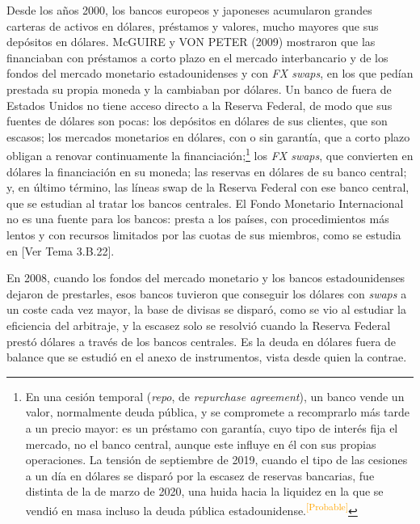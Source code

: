 \documentclass[10pt,a4paper]{article}
\newcommand{\authorfont}[1]{{\fontfamily{EBGaramond-TLF}\selectfont #1}}
\newcounter{anexo}
\begin{document}
Desde los años 2000, los bancos europeos y japoneses acumularon grandes carteras de activos en dólares, préstamos y valores, mucho mayores que sus depósitos en dólares. McGUIRE y VON PETER (2009) mostraron que las financiaban con préstamos a corto plazo en el mercado interbancario y de los fondos del mercado monetario estadounidenses y con \textit{FX swaps}, en los que pedían prestada su propia moneda y la cambiaban por dólares. Un banco de fuera de Estados Unidos no tiene acceso directo a la Reserva Federal, de modo que sus fuentes de dólares son pocas: los depósitos en dólares de sus clientes, que son escasos; los mercados monetarios en dólares, con o sin garantía, que a corto plazo obligan a renovar continuamente la financiación;\footnote{%
    En una cesión temporal (\textit{repo}, de \textit{repurchase agreement}), un banco vende un valor, normalmente deuda pública, y se compromete a recomprarlo más tarde a un precio mayor: es un préstamo con garantía, cuyo tipo de interés fija el mercado, no el banco central, aunque este influye en él con sus propias operaciones. La tensión de septiembre de 2019, cuando el tipo de las cesiones a un día en dólares se disparó por la escasez de reservas bancarias, fue distinta de la de marzo de 2020, una huida hacia la liquidez en la que se vendió en masa incluso la deuda pública estadounidense.\textcolor{orange}{\textsuperscript{[Probable]}}
} los \textit{FX swaps}, que convierten en dólares la financiación en su moneda; las reservas en dólares de su banco central; y, en último término, las líneas swap de la Reserva Federal con ese banco central, que se estudian al tratar los bancos centrales. El Fondo Monetario Internacional no es una fuente para los bancos: presta a los países, con procedimientos más lentos y con recursos limitados por las cuotas de sus miembros, como se estudia en [\authorfont{Ver Tema 3.B.22}].

En 2008, cuando los fondos del mercado monetario y los bancos estadounidenses dejaron de prestarles, esos bancos tuvieron que conseguir los dólares con \textit{swaps} a un coste cada vez mayor, la base de divisas se disparó, como se vio al estudiar la eficiencia del arbitraje, y la escasez solo se resolvió cuando la Reserva Federal prestó dólares a través de los bancos centrales. Es la deuda en dólares fuera de balance que se estudió en el anexo de instrumentos, vista desde quien la contrae.
\end{document}
